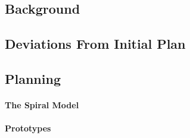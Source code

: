 
\subsection{Background}


\subsection{Deviations From Initial Plan}
\label{sec:devi-from-init-pln}

\subsection{Planning}
\label{sec:planning}

\paragraph{The Spiral Model}
\label{sec:spiral-model}

\paragraph{Prototypes}
\label{sec:prototypes}